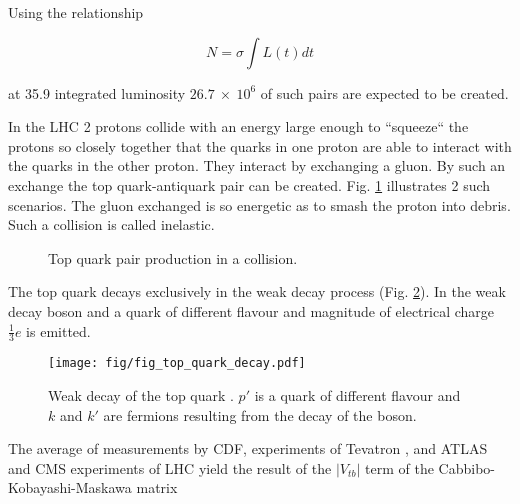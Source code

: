 Using the relationship

\begin{equation}
N=\sigma\int L(t)dt
\end{equation}

at 35.9 \fbinv integrated luminosity $26.7\ \times\ 10^{6}$ of such pairs are expected to be created. 

In the LHC 2 protons collide with an energy large enough to ``squeeze`` the protons so closely together that the quarks in one proton are able to interact with the quarks in the other proton. They interact by exchanging a gluon. By such an exchange the top quark-antiquark pair can be created. Fig. \ref{fig:top_quark_productions} illustrates 2 such scenarios. The gluon exchanged is so energetic as to smash the proton into debris. Such a collision is called inelastic.

\begin{figure}[h!]
  \centering
  \def\twidth{0.45}
  \hfil

  \caption{Top quark pair production in a \Pp\Pp collision.}
  \label{fig:top_quark_productions}
\end{figure}

The top quark decays exclusively in the weak decay process (Fig. \ref{fig:quark_decay}). In the weak decay \PW boson and a quark of different flavour and magnitude of electrical charge $\frac{1}{3}e$ is emitted. 

\begin{figure}[H]
  \centering
  \texttt{[image: fig/fig\_top\_quark\_decay.pdf]}
  \caption{Weak decay of the top quark \cPqt. $p'$ is a quark of different flavour and $k$ and $k'$ are fermions resulting from the decay of the \PW boson.}
  \label{fig:quark_decay}
\end{figure}

The average of measurements by CDF, \DZERO experiments of Tevatron \cite{Aaltonen:2015cra}, and ATLAS and CMS experiments of LHC \cite{twiki:tt_curve_toplhcwg_sep18} yield the result of the $|V_{tb}|$ term of the Cabbibo-Kobayashi-Maskawa matrix

